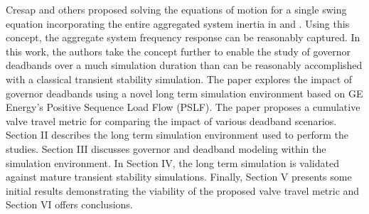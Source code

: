 Cresap and others proposed solving the equations of motion for a single swing equation incorporating the entire aggregated system inertia in \cite{AGCCresap} and \cite{CarsonTaylor}. Using this concept, the aggregate system frequency response can be reasonably captured. In this work, the authors take the concept further to enable the study of governor deadbands over a much simulation duration than can be reasonably accomplished with a classical transient stability simulation. The paper explores the impact of governor deadbands using a novel long term simulation environment based on GE Energy's Positive Sequence Load Flow (PSLF)\cite{PSLFUserManual}. 
The paper proposes a cumulative valve travel metric for comparing the impact of various deadband scenarios. 
Section II describes the long term simulation environment used to perform the studies. 
Section III discusses governor and deadband modeling within the simulation environment. 
In Section IV, the long term simulation is validated against mature transient stability simulations. 
Finally, Section V presents some initial results demonstrating the viability of the proposed valve travel metric and Section VI offers conclusions.


